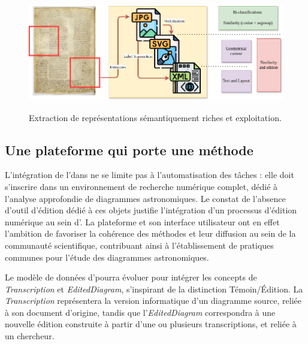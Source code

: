  \begin{figure}[H]
          \begin{center}
          \includegraphics[height=5cm]{figues/layers.png}
          \end{center}
          \caption{Extraction de représentations sémantiquement riches et exploitation. }
          \label{fig:layers} \end{figure}

\hypertarget{une-plateforme-qui-porte-une-methode}{%
\subsection{Une plateforme qui porte une méthode}\label{une-plateforme-qui-porte-une-methode}}

L'intégration de l'\ia dans \aikon ne se limite pas à l'automatisation des
tâches : elle doit s'inscrire dans un environnement de recherche
numérique complet, dédié à l'analyse approfondie de diagrammes
astronomiques. Le constat de l'absence d'outil d'édition dédié à ces
objets justifie l'intégration d'un processus d'édition numérique au sein
d'\aikon. La plateforme et son interface utilisateur ont en effet
l'ambition de favoriser la cohérence des méthodes et leur diffusion au
sein de la communauté scientifique, contribuant ainsi à l'établissement
de pratiques communes pour l'étude des diagrammes astronomiques.

Le modèle de données d'\aikon pourra évoluer pour intégrer les concepts
de \textit{Transcription} et \textit{EditedDiagram}, s'inspirant de la distinction
Témoin/Édition. La \textit{Transcription} représentera la version
informatique d'un diagramme source, reliée à son document d'origine,
tandis que l'\textit{EditedDiagram} correspondra à une nouvelle édition
construite à partir d'une ou plusieurs transcriptions, et reliée à un
chercheur.

